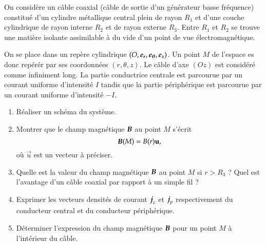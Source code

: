 \begin{exocor}
	On considère un câble coaxial (câble de sortie d'un générateur basse fréquence)
	constitué d'un cylindre métallique central plein de rayon $R_1$ et d'une 
	couche cylindrique de rayon interne $R_2$ et de rayon externe $R_3$. 
	Entre $R_1$ et $R_2$ se trouve une matière isolante assimilable à du vide d'un 
	point de vue électromagnétique. 
	
	On se place dans un repère cylindrique 
	$(O, \er, \etheta, \ez)$. Un point $M$ de l'espace es donc repérér par 
	ses coordonnées $(r, \theta, z)$. Le câble d'axe $(Oz)$ est considéré
	comme infiniment long. La partie conductrice centrale est parcourue 
	par un courant uniforme d'intensité $I$ tandis que la partie périphérique
	est parcourue par un courant uniforme d'intensité $-I$.

	\begin{enumerate}
		\item Réaliser un schéma du système.
		\item Montrer que le champ magnétique $\vecb$ au point $M$ s'écrit
		\begin{equation*}
			\vecb(M) = B(r) \vec{u},
		\end{equation*}
		où $\vec{u}$ est un vecteur à préciser.
		\item Quelle est la valeur du champ magnétique $\vecb$ au point $M$
		  si $r > R_3$ ? Quel est l'avantage d'un câble coaxial par rapport
		  à un simple fil ?
		\item Exprimer les vecteurs densités de courant $\vecj_c$ et 
		  $\vecj_p$ respectivement du conducteur central et du conducteur 
		  périphérique.
		\item Déterminer l'expression du champ magnétique $\vecb$ pour
		  un point $M$ à l'intérieur du câble.
	\end{enumerate}
\end{exocor}
\newpage
